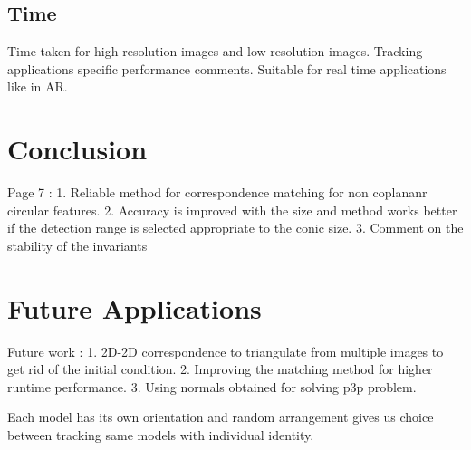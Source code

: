 \documentclass{bmvc2k}
\begin{document}
\subsection{Time}
Time taken for high resolution images and low resolution images. Tracking applications specific performance comments. Suitable for real time applications like in AR. 

\section{Conclusion}
Page 7 : 
1. Reliable method for correspondence matching for non coplananr circular features. 
2. Accuracy is improved with the size and method works better if the detection range is selected appropriate to the conic size. 
3. Comment on the stability of the invariants 

\section{Future Applications}
Future work : 
1. 2D-2D correspondence to triangulate from multiple images to get rid of the initial condition. 
2. Improving the matching method for higher runtime performance.
3. Using normals obtained for solving p3p problem. 

Each model has its own orientation and random arrangement gives us choice between tracking same models with individual identity. 



\end{document}
